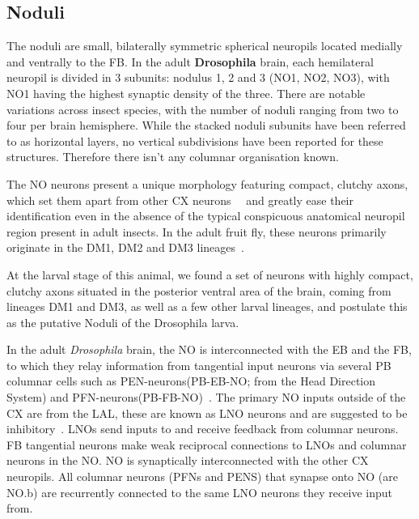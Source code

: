 
    \subsection{Noduli}
    \label{NO}
    The noduli are small, bilaterally symmetric spherical neuropils located medially and ventrally to the FB. In the adult \textbf{Drosophila} brain, each hemilateral neuropil is divided in 3 subunits: nodulus 1, 2 and 3 (NO1, NO2, NO3), with NO1 having the highest synaptic density of the three. There are notable variations across insect species, with the number of noduli ranging from two to four per brain hemisphere.
    While the stacked noduli subunits have been referred to as horizontal layers, no vertical subdivisions have been reported for these structures. Therefore there isn't any columnar organisation known.


    The NO neurons present a unique morphology featuring compact, clutchy axons, which set them apart from other CX neurons~\citep{wolff2018neuroarchitecture}~\citep{hulse2021connectome} and greatly ease their identification even in the absence of the typical conspicuous anatomical neuropil region present in adult insects. In the adult fruit fly, these neurons primarily originate in the DM1, DM2 and DM3 lineages~\citep{andrade2019developmentally}.


    At the larval stage of this animal, we found a set of neurons with highly compact, clutchy axons situated in the posterior ventral area of the brain, coming from lineages DM1 and DM3, as well as a few other larval lineages, and postulate this as the putative Noduli of the Drosophila larva. 

    In the adult \textit{Drosophila} brain, the NO is  interconnected with the EB and the FB, to which they relay information from tangential input neurons via several PB columnar cells such as PEN-neurons(PB-EB-NO; from the Head Direction System) and PFN-neurons(PB-FB-NO)~\citep{wolff2015neuroarchitecture, hulse2021connectome}. The primary NO inputs outside of the CX are from the LAL, these are known as LNO neurons and are suggested to be inhibitory~\citep{wolff2018neuroarchitecture,hulse2021connectome}. LNOs send inputs to and receive feedback from columnar neurons. %
    FB tangential neurons make weak reciprocal connections to LNOs and columnar neurons in the NO.
    NO is synaptically interconnected with the other CX neuropils. All columnar neurons (PFNs and PENS) that synapse onto NO (are NO.b) are recurrently connected to the same LNO neurons they receive input from. 

